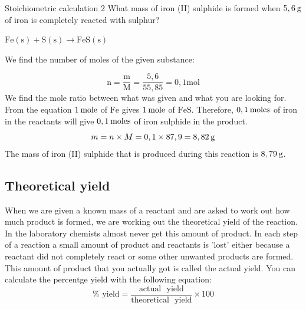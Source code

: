       \begin{wex}{Stoichiometric calculation 2 }
{
      \label{m38712*probfhsst!!!underscore!!!id1973}
      \label{m38712*id284347}What mass of iron (II) sulphide is formed when $5,6\phantom{\rule{2pt}{0ex}}\text{g}$ of iron is completely reacted with sulphur?
      }
{
      \label{m38712*id284378}$\text{Fe}\left(\text{s}\right)+\text{S}\left(\text{s}\right)\to \text{FeS}\left(\text{s}\right)$
       
       We find the number of moles of the given substance:  
      \label{m38712*id284430}\nopagebreak\noindent{}
        
    \begin{equation*}
    \text{n}=\frac{\text{m}}{\text{M}}=\frac{5,6}{55,85}=0,1\text{mol}
      \end{equation*}
       We find the mole ratio between what was given and what you are looking for. From the equation $1\phantom{\rule{2pt}{0ex}}\text{mole}$ of $\text{Fe}$ gives $1\phantom{\rule{2pt}{0ex}}\text{mole}$ of $\text{FeS}$. Therefore, $0,1\phantom{\rule{2pt}{0ex}}\text{moles}$ of iron in the reactants will give $0,1\phantom{\rule{2pt}{0ex}}\text{moles}$ of iron sulphide in the product. 
      \label{m38712*id284499}\nopagebreak\noindent{}
    \begin{equation*}
    m=n\ensuremath{\times}M=0,1\ensuremath{\times}87,9=8,82\phantom{\rule{2pt}{0ex}}\text{g}
      \end{equation*}
      \label{m38712*id284548}The mass of iron (II) sulphide that is produced during this reaction is $8,79\phantom{\rule{2pt}{0ex}}\text{g}$. 
}
    \end{wex}
    \noindent
\subsection*{Theoretical yield}
\label{m38712*eip-943}When we are given a known mass of a reactant and are asked to work out how much product is formed, we are working out the theoretical yield of the reaction. In the laboratory chemists almost never get this amount of product. In each step of a reaction a small amount of product and reactants is 'lost' either because a reactant did not completely react or some other unwanted products are formed. This amount of product that you actually got is called the actual yield. You can calculate the percentge yield with the following equation:
\begin{equation*}
 \text{\% ~yield} = \frac{\text{actual ~yield}}{\text{theoretical ~yield}} \times 100
\end{equation*}

